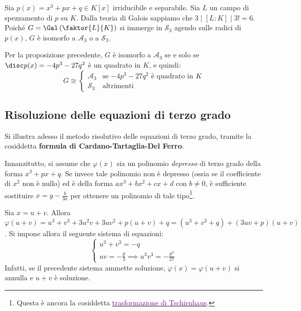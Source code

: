 \documentclass[11pt]{scrartcl}
\begin{document}
	\begin{example}
		Sia $p(x) = x^3 + px + q \in K[x]$ irriducibile e separabile. Sia $L$ un
		campo di spezzamento di $p$ su $K$. Dalla teoria di Galois sappiamo che
		$3 \mid [L : K] \mid 3! = 6$. Poiché $G = \Gal\left(\faktor{L}{K}\right)$ si
		immerge in $\mathcal{S}_3$ agendo sulle radici di $p(x)$, $G$ è isomorfo a $\mathcal{A}_3$
		o a $\mathcal{S}_3$. \medskip
		
		
		Per la proposizione precedente, $G$ è isomorfo a $\mathcal{A}_3$ se e solo
		se $\disc p(x) = -4p^3 - 27q^2$ è un quadrato in $K$, e quindi:
		\[ G \cong \begin{cases}
			\mathcal{A}_3 & \text{se $-4p^3-27q^2$ è quadrato in $K$} \\
			\mathcal{S}_3 & \text{altrimenti}
		\end{cases} \]  
	\end{example}
	
	\newpage
	\subsection{Risoluzione delle equazioni di terzo grado}
	Si illustra adesso il metodo risolutivo delle equazioni di terzo grado,
	tramite la cosiddetta \textbf{formula di Cardano-Tartaglia-Del Ferro}.\medskip
	
	
	Innanzitutto, si
	assume che $\varphi(x)$ sia un polinomio \textit{depresso} di terzo grado
	della forma $x^3 + px + q$. Se invece tale polinomio non è depresso (ossia se il coefficiente
	di $x^2$ non è nullo) ed è della forma $ax^3 + bx^2 + cx + d$ con $b \neq 0$, è sufficiente sostituire $x = y - \frac{b}{3a}$ per
	ottenere un polinomio di tale tipo\footnote{
		Questa è ancora la cosiddetta \href{https://en.wikipedia.org/wiki/Tschirnhaus_transformation}{\textcolor{purple}{trasformazione di Tschirnhaus}}.
	}. \medskip
	
	
	Sia $x = u + v$. Allora $\varphi(u + v) = u^3 + v^3 + 3 u^2 v + 3 u v^2 + p(u + v) + q =
	(u^3 + v^3 + q) + (3uv + p)(u + v)$. Si impone allora il seguente sistema di
	equazioni:
	\[ \begin{cases}
		u^3 + v^3 = -q \\
		uv = -\frac{p}{3} \implies u^3 v^3 = - \frac{p^3}{27}
	\end{cases} \]
	Infatti, se il precedente sistema ammette soluzione, $\varphi(x) = \varphi(u + v)$ si annulla e
	$u + v$ è soluzione. \medskip
	
\end{document}

